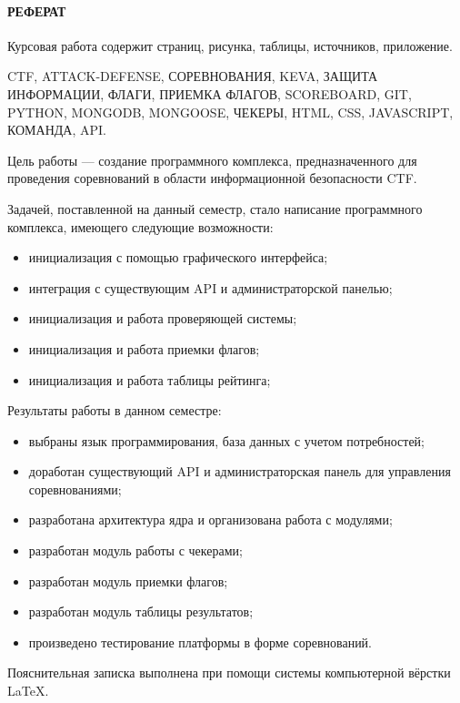 \newpage
{}
\paragraph{\hfill РЕФЕРАТ \hfill}
Курсовая работа содержит  страниц,  рисунка,  таблицы,  источников,  приложение.

CTF, ATTACK-DEFENSE, СОРЕВНОВАНИЯ, KEVA, ЗАЩИТА ИНФОРМАЦИИ, ФЛАГИ, ПРИЕМКА ФЛАГОВ, SCOREBOARD, GIT, PYTHON, MONGODB, MONGOOSE, ЧЕКЕРЫ, HTML, CSS, JAVASCRIPT, КОМАНДА, API.

Цель работы --- создание программного комплекса, предназначенного для проведения соревнований в области информационной безопасности CTF.

Задачей, поставленной на данный семестр, стало написание программного комплекса, имеющего следующие возможности: 
\begin{itemize}
\item инициализация с помощью графического интерфейса;
\item интеграция с существующим API и администраторской панелью; 
\item инициализация и работа проверяющей системы;
\item инициализация и работа приемки флагов;
\item инициализация и работа таблицы рейтинга;
\end{itemize}

Результаты работы в данном семестре:

\begin{itemize}
\item выбраны язык программирования, база данных с учетом потребностей;
\item доработан существующий API и администраторская панель для управления соревнованиями; 
\item разработана архитектура ядра и организована работа с модулями;
\item разработан модуль работы с чекерами;
\item разработан модуль приемки флагов;
\item разработан модуль таблицы результатов;
\item произведено тестирование платформы в форме соревнований.
\end{itemize}

Пояснительная записка выполнена при помощи системы компьютерной вёрстки \LaTeX.
